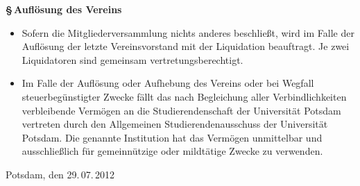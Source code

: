 \documentclass[11pt]{article}
\def\items#1{{%
  \itcounter0%
  \begin{itemize}
  #1
  \end{itemize}
}}
\let\it\item%
\def\item{
  \advance\itcounter1%
  \it[(\the\itcounter)]
}
\def\paragraf#1{
  \advance\itcounter1%
  \par\medskip
  {\large\bfseries \S\,\the\itcounter\quad#1}
  \par\smallskip
}
\begin{document}
\paragraf{Aufl{\"o}sung des Vereins}

\items{
   \item
     Sofern die Mitgliederversammlung nichts anderes beschlie{\ss}t, wird im Falle der Aufl{\"o}sung
     der letzte Vereinsvorstand mit der Liquidation beauftragt. Je zwei Liquidatoren sind
     gemeinsam vertretungsberechtigt.
   \item
     Im Falle der Aufl{\"o}sung oder Aufhebung des Vereins oder bei Wegfall steuerbeg{\"u}nstigter
     Zwecke f{\"a}llt das nach Begleichung aller Verbindlichkeiten verbleibende Verm{\"o}gen
     an die Studierendenschaft der Universit{\"a}t Potsdam vertreten durch
     den Allgemeinen Studierendenausschuss der Universit{\"a}t Potsdam.
     Die genannte Institution hat das Verm{\"o}gen unmittelbar und ausschlie{\ss}lich f{\"u}r
     gemeinn{\"u}tzige oder mildt{\"a}tige Zwecke zu verwenden.
}

\par\bigskip
Potsdam, den 29.\,07.\,2012
\end{document}

